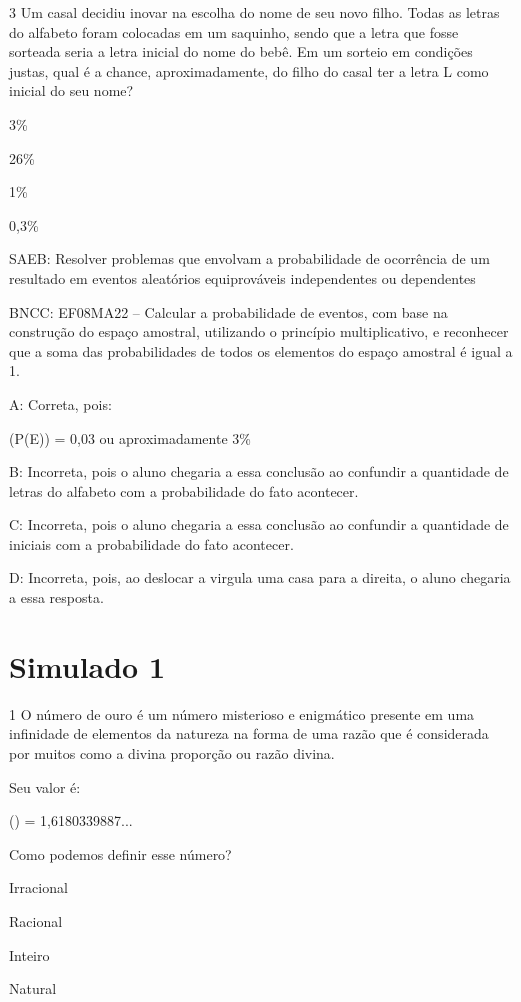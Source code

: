 {\num{3} Um casal decidiu inovar na escolha do nome de seu novo filho. Todas
as letras do alfabeto foram colocadas em um saquinho, sendo que a letra
que fosse sorteada seria a letra inicial do nome do bebê. Em um sorteio
em condições justas, qual é a chance, aproximadamente, do filho do casal
ter a letra L como inicial do seu nome?
\item 3\%
\item 26\%
\item 1\%
\item 0,3\%


SAEB: Resolver problemas que envolvam a probabilidade de ocorrência de
um resultado em eventos aleatórios equiprováveis independentes ou
dependentes

BNCC: EF08MA22 -- Calcular a probabilidade de eventos, com base na
construção do espaço amostral, utilizando o princípio multiplicativo, e
reconhecer que a soma das probabilidades de todos os elementos do espaço
amostral é igual a 1.

A: Correta, pois:

(P(E)) = 0,03 ou aproximadamente 3\%

B: Incorreta, pois o aluno chegaria a essa conclusão ao confundir a
quantidade de letras do alfabeto com a probabilidade do fato acontecer.

C: Incorreta, pois o aluno chegaria a essa conclusão ao confundir a
quantidade de iniciais com a probabilidade do fato acontecer.

D: Incorreta, pois, ao deslocar a virgula uma casa para a direita, o
aluno chegaria a essa resposta.


\section*{Simulado 1}

\num{1} O número de ouro é um número misterioso e enigmático presente em uma
infinidade de elementos da natureza na forma de uma razão que é
considerada por muitos como a divina proporção ou razão divina.

Seu valor é:

() = 1,6180339887...

Como podemos definir esse número?
\item Irracional
\item Racional
\item Inteiro
\item Natural

}
